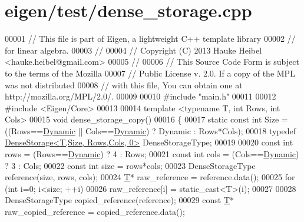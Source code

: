 \hypertarget{eigen_2test_2dense__storage_8cpp_source}{}\section{eigen/test/dense\+\_\+storage.cpp}
\label{eigen_2test_2dense__storage_8cpp_source}

\begin{DoxyCode}
00001 \textcolor{comment}{// This file is part of Eigen, a lightweight C++ template library}
00002 \textcolor{comment}{// for linear algebra.}
00003 \textcolor{comment}{//}
00004 \textcolor{comment}{// Copyright (C) 2013 Hauke Heibel <hauke.heibel@gmail.com>}
00005 \textcolor{comment}{//}
00006 \textcolor{comment}{// This Source Code Form is subject to the terms of the Mozilla}
00007 \textcolor{comment}{// Public License v. 2.0. If a copy of the MPL was not distributed}
00008 \textcolor{comment}{// with this file, You can obtain one at http://mozilla.org/MPL/2.0/.}
00009 
00010 \textcolor{preprocessor}{#include "main.h"}
00011 
00012 \textcolor{preprocessor}{#include <Eigen/Core>}
00013 
00014 \textcolor{keyword}{template} <\textcolor{keyword}{typename} T, \textcolor{keywordtype}{int} Rows, \textcolor{keywordtype}{int} Cols>
00015 \textcolor{keywordtype}{void} dense\_storage\_copy()
00016 \{
00017   \textcolor{keyword}{static} \textcolor{keyword}{const} \textcolor{keywordtype}{int} Size = ((Rows==\hyperlink{namespace_eigen_ad81fa7195215a0ce30017dfac309f0b2}{Dynamic} || Cols==\hyperlink{namespace_eigen_ad81fa7195215a0ce30017dfac309f0b2}{Dynamic}) ? Dynamic : Rows*Cols);
00018   \textcolor{keyword}{typedef} \hyperlink{class_eigen_1_1_dense_storage}{DenseStorage<T,Size, Rows,Cols, 0>} DenseStorageType;
00019   
00020   \textcolor{keyword}{const} \textcolor{keywordtype}{int} rows = (Rows==\hyperlink{namespace_eigen_ad81fa7195215a0ce30017dfac309f0b2}{Dynamic}) ? 4 : Rows;
00021   \textcolor{keyword}{const} \textcolor{keywordtype}{int} cols = (Cols==\hyperlink{namespace_eigen_ad81fa7195215a0ce30017dfac309f0b2}{Dynamic}) ? 3 : Cols;
00022   \textcolor{keyword}{const} \textcolor{keywordtype}{int} size = rows*cols;
00023   DenseStorageType reference(size, rows, cols);
00024   \hyperlink{group___sparse_core___module}{T}* raw\_reference = reference.data();
00025   \textcolor{keywordflow}{for} (\textcolor{keywordtype}{int} i=0; i<size; ++i)
00026     raw\_reference[i] = static\_cast<T>(i);
00027     
00028   DenseStorageType copied\_reference(reference);
00029   \textcolor{keyword}{const} \hyperlink{group___sparse_core___module}{T}* raw\_copied\_reference = copied\_reference.data();

\end{DoxyCode}
